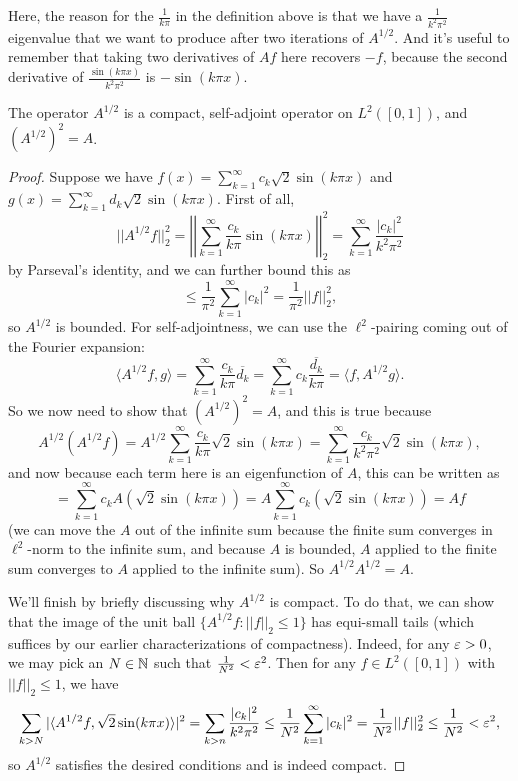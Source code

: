 Here, the reason for the $\frac{1}{k\pi}$ in the definition above is that we have a $\frac{1}{k^2\pi^2}$ eigenvalue that we want to produce after two iterations of $A^{1/2}$. And it's useful to remember that taking two derivatives of $Af$ here recovers $-f$, because the second derivative of $\frac{\sin (k \pi x)}{k^2\pi^2}$ is $-\sin(k \pi x)$. 

\begin{theorem}
The operator $A^{1/2}$ is a compact, self-adjoint operator on $L^2([0, 1])$, and $(A^{1/2})^2 = A$.
\end{theorem}
\begin{proof}
Suppose we have $f(x) = \sum_{k=1}^{\infty} c_k \sqrt{2} \sin(k \pi x)$ and $g(x) = \sum_{k=1}^{\infty} d_k \sqrt{2} \sin (k \pi x)$. First of all, 
\[
    ||A^{1/2} f||_2^2 = \left|\left|\sum_{k=1}^{\infty} \frac{c_k}{k\pi} \sin(k \pi x)\right|\right|_2^2 = \sum_{k=1}^{\infty} \frac{|c_k|^2}{k^2\pi^2}
\]
by Parseval's identity, and we can further bound this as
\[
    \le \frac{1}{\pi^2} \sum_{k=1}^{\infty} |c_k|^2 = \frac{1}{\pi^2} ||f||_2^2,
\]
so $A^{1/2}$ is bounded. For self-adjointness, we can use the $\ell^2$-pairing coming out of the Fourier expansion:
\[
    \langle A^{1/2} f, g \rangle = \sum_{k=1}^{\infty}\frac{c_k}{k\pi} \overline{d_k} = \sum_{k=1}^{\infty} c_k \overline{\frac{d_k}{k\pi}} = \langle f, A^{1/2} g \rangle.
\]
So we now need to show that $(A^{1/2})^2 = A$, and this is true because 
\[
    A^{1/2}(A^{1/2} f) = A^{1/2} \sum_{k=1}^{\infty} \frac{c_k}{k\pi} \sqrt{2} \sin(k \pi x) = \sum_{k=1}^{\infty} \frac{c_k}{k^2\pi^2} \sqrt{2} \sin(k \pi x),
\]  
and now because each term here is an eigenfunction of $A$, this can be written as 
\[
    = \sum_{k=1}^{\infty} c_k A (\sqrt{2} \sin(k \pi x)) = A\sum_{k=1}^{\infty} c_k (\sqrt{2} \sin(k \pi x)) = Af
\]
(we can move the $A$ out of the infinite sum because the finite sum converges in $\ell^2$-norm to the infinite sum, and because $A$ is bounded, $A$ applied to the finite sum converges to $A$ applied to the infinite sum). So $A^{1/2}A^{1/2} = A$.

We'll finish by briefly discussing why $A^{1/2}$ is compact. To do that, we can show that the image of the unit ball $\{A^{1/2}f: ||f||_2 \le 1\}$ has equi-small tails (which suffices by our earlier characterizations of compactness). Indeed, for any $\varepsilon > 0$, we may pick an $N \in \mathbb N$ such that $\frac{1}{N^2} < \varepsilon^2$. Then for any $f \in L^2([0, 1])$ with $||f||_2 \le 1$, we have
\[
    \sum_{k>N} |\langle A^{1/2} f, \sqrt{2} \sin(k \pi x) \rangle|^2 = \sum_{k>n} \frac{|c_k|^2}{k^2\pi^2} \le \frac{1}{N^2} \sum_{k=1}^{\infty} |c_k|^2 = \frac{1}{N^2}||f||_2^2 \le \frac{1}{N^2} < \varepsilon^2,
\]
so $A^{1/2}$ satisfies the desired conditions and is indeed compact. 
\end{proof}

